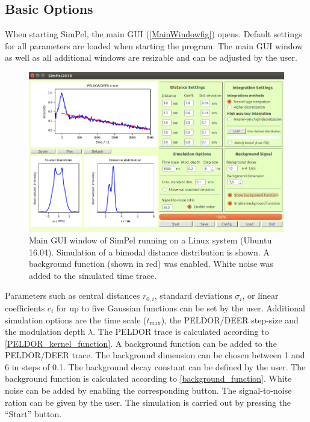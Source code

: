 \documentclass[pdftex,bezier,german,a4,twoside, headexclude,12pt,nochapterprefix, titlepage]{extarticle}
\newcommand{\simpel}{\textsf{SimPel}}
\begin{document}
\subsection{Basic Options}
When starting \simpel, the main GUI (\autoref{MainWindowfig}) opens. Default settings for all parameters are loaded when starting
the program. The main GUI window as well as all additional windows are resizable and can be adjusted by the user.
\begin{figure}[h!]
\begin{center}
\includegraphics[scale=0.5]{Main_Window_example.png}
\caption{Main GUI window of \simpel{} running on a Linux system (Ubuntu 16.04). Simulation of a bimodal distance distribution is shown. A background
function (shown in red) was enabled. White noise was added to the simulated time trace.}
\label{MainWindowfig}
\end{center}
\end{figure}
Parameters such as central distances $r_{0,i}$, standard deviations $\sigma_i$, or linear coefficients $c_i$ for up to five
Gaussian functions can be set by the user. Additional simulation options are the time scale ($t_{\mathrm{max}}$), the 
PELDOR/DEER step-size and the modulation depth $\lambda$. The PELDOR trace is calculated according to  \autoref{PELDOR_kernel_function}.
A background function can be added to the PELDOR/DEER trace. The background dimension 
can be chosen between 1 and 6 in steps of 0.1. The background decay constant can be defined by the user. The background function is calculated according to \autoref{background_function}. White noise can be added by enabling the corresponding button. The signal-to-noise
ration can be given by the user.
The simulation is carried out by pressing the ``Start'' button. 
\end{document}
